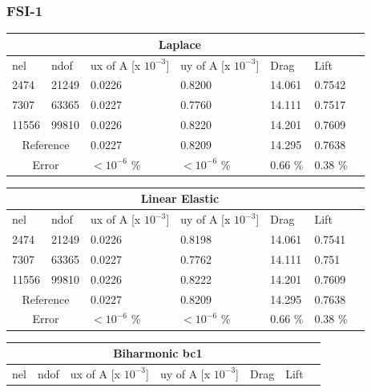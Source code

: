 \subsubsection{FSI-1}
\begin{table}[h!]
\centering
\label{FSI-1 Results}
\begin{tabular}{ |p{1cm}||p{1cm}|p{2.8cm}|p{2.8cm}|p{2.7cm}|p{2.7cm}|p{1.2cm}|}
 \hline
  \multicolumn{6}{|c|}{Laplace} \\
   \hline
nel & ndof & ux of A [x $10^{-3}$]  &uy of A [x $10^{-3}$]& Drag  & Lift \\
 \hline
 2474    & 21249  &       0.0226 &       0.8200 & 14.061 & 0.7542 \\
 7307    & 63365  &       0.0227 &       0.7760 & 14.111 & 0.7517 \\
 11556   & 99810  &       0.0226 &      0.8220 & 14.201 & 0.7609 \\
  \hline
 \multicolumn{2}{|c|}{Reference} &  0.0227      &       0.8209      & 14.295  & 0.7638   \\
 \hline
     \multicolumn{2}{|c|}{Error}  & $ < 10^{-6}$  \% &  $ <10^{-6}$  \% & 0.66 \% & 0.38 \% \\
   \hline
\end{tabular}
\begin{tabular}{ |p{1cm}||p{1cm}|p{2.8cm}|p{2.8cm}|p{2.7cm}|p{2.7cm}|p{1.2cm}|}
 \hline
  \multicolumn{6}{|c|}{Linear Elastic} \\
   \hline
nel & ndof & ux of A [x $10^{-3}$]  &uy of A [x $10^{-3}$]& Drag  & Lift \\
 \hline
 2474    & 21249  &       0.0226 &       0.8198 & 14.061 & 0.7541 \\
 7307    & 63365  &       0.0227 &       0.7762 & 14.111 & 0.751  \\
 11556   & 99810  &       0.0226  &       0.8222 & 14.201 & 0.7609 \\
  \hline
 \multicolumn{2}{|c|}{Reference} &  0.0227      &       0.8209      & 14.295  & 0.7638   \\
 \hline
    \multicolumn{2}{|c|}{Error}  &$ < 10^{-6}$  \% &  $ <10^{-6}$  \%  & 0.66 \% & 0.38 \% \\
 \hline
\end{tabular}
\begin{tabular}{ |p{1cm}||p{1cm}|p{2.8cm}|p{2.8cm}|p{2.7cm}|p{2.7cm}|p{1.2cm}|}
 \hline
  \multicolumn{6}{|c|}{Biharmonic bc1} \\
   \hline
nel & ndof & ux of A [x $10^{-3}$]  &uy of A [x $10^{-3}$]& Drag  & Lift \\

\end{tabular}
\end{table}
